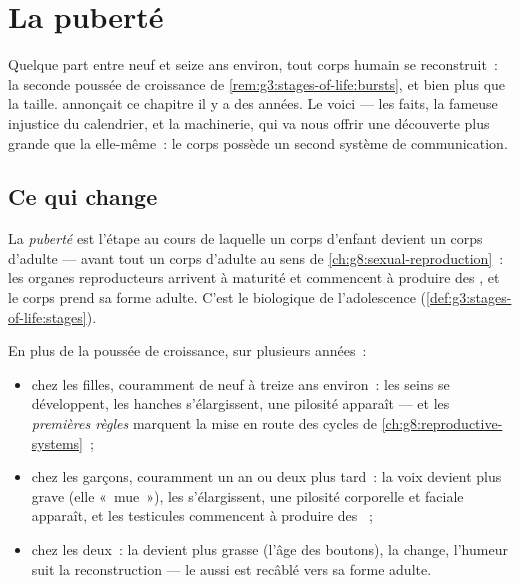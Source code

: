 \chapter{La puberté}\label{ch:g8:puberty}

Quelque part entre neuf et seize ans environ, tout corps humain se
reconstruit~: la seconde poussée de croissance de
\cref{rem:g3:stages-of-life:bursts}, et bien plus que la taille.
 annonçait ce chapitre il y a
des années. Le voici --- les faits, la fameuse injustice du
calendrier, et la machinerie, qui va nous offrir une découverte plus
grande que la  elle-même~: le corps possède un second système
de communication.

\section{Ce qui change}

\begin{definition}[Puberté]\label{def:g8:puberty:puberty}
La \emph{puberté} est l'étape au cours de laquelle un
corps d'enfant devient un corps d'adulte --- avant tout un corps
d'adulte au sens de \cref{ch:g8:sexual-reproduction}~: les organes
reproducteurs arrivent à maturité et commencent à produire des
\emph{}, et le corps prend sa forme adulte. C'est le 
biologique de l'adolescence
(\cref{def:g3:stages-of-life:stages}).
\end{definition}

\begin{proposition}\label{prop:g8:puberty:changes}
En plus de la poussée de croissance, sur plusieurs années~:
\begin{itemize}
  \item chez les filles, couramment de neuf à treize ans environ~:
        les seins se développent, les hanches s'élargissent, une
        pilosité apparaît --- et les \emph{premières règles}
        marquent la mise en route des cycles de
        \cref{ch:g8:reproductive-systems}~;
  \item chez les garçons, couramment un an ou deux plus tard~: la
        voix devient plus grave (elle «~mue~»), les 
        s'élargissent, une pilosité corporelle et faciale apparaît,
        et les testicules commencent à produire des ~;
  \item chez les deux~: la  devient plus grasse (l'âge des
        boutons), la  change, l'humeur suit la reconstruction
        --- le  aussi est recâblé vers sa forme adulte.
\end{itemize}
\end{proposition}
\admitted


